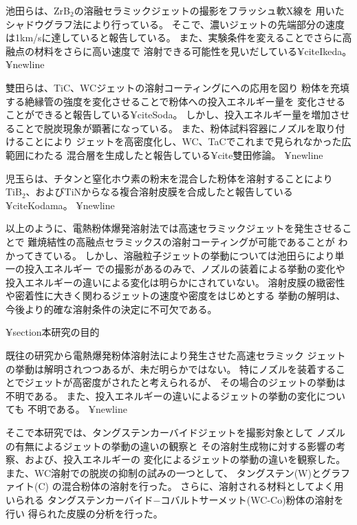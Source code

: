 池田らは、ZrB$_2$の溶融セラミックジェットの撮影をフラッシュ軟X線を
用いたシャドウグラフ法により行っている。
そこで、濃いジェットの先端部分の速度は1km/sに達していると報告している。
また、実験条件を変えることでさらに高融点の材料をさらに高い速度で
溶射できる可能性を見いだしている¥cite{Ikeda}。
¥newline

雙田らは、TiC、WCジェットの溶射コーティングにへの応用を図り
粉体を充填する絶縁管の強度を変化させることで粉体への投入エネルギー量を
変化させることができると報告している¥cite{Soda}。
しかし、投入エネルギー量を増加させることで脱炭現象が顕著になっている。
また、粉体試料容器にノズルを取り付けることにより
ジェットを高密度化し、WC、TaCでこれまで見られなかった広範囲にわたる
混合層を生成したと報告している¥cite{雙田修論}。
¥newline

児玉らは、チタンと窒化ホウ素の粉末を混合した粉体を溶射することにより
TiB$_2$、およびTiNからなる複合溶射皮膜を合成したと報告している¥cite{Kodama}。
¥newline

以上のように、電熱粉体爆発溶射法では高速セラミックジェットを発生させることで
難焼結性の高融点セラミックスの溶射コーティングが可能であることが
わかってきている。
しかし、溶融粒子ジェットの挙動については池田らにより単一の投入エネルギー
での撮影があるのみで、ノズルの装着による挙動の変化や
投入エネルギーの違いによる変化は明らかにされていない。
溶射皮膜の緻密性や密着性に大きく関わるジェットの速度や密度をはじめとする
挙動の解明は、今後より的確な溶射条件の決定に不可欠である。

¥section{本研究の目的}

既往の研究から電熱爆発粉体溶射法により発生させた高速セラミック
ジェットの挙動は解明されつつあるが、未だ明らかではない。
特にノズルを装着することでジェットが高密度がされたと考えられるが、
その場合のジェットの挙動は不明である。
また、投入エネルギーの違いによるジェットの挙動の変化についても
不明である。
¥newline

そこで本研究では、タングステンカーバイドジェットを撮影対象として
ノズルの有無によるジェットの挙動の違いの観察と
その溶射生成物に対する影響の考察、および、投入エネルギーの
変化によるジェットの挙動の違いを観察した。
また、WC溶射での脱炭の抑制の試みの一つとして、
タングステン(W)とグラファイト(C)
の混合粉体の溶射を行った。
さらに、溶射される材料としてよく用いられる
タングステンカーバイド−コバルトサーメット(WC-Co)粉体の溶射を行い
得られた皮膜の分析を行った。

